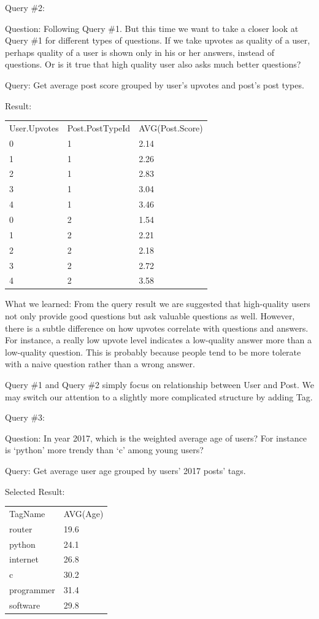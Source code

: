 Query \#2:

Question: 	Following  Query \#1. But this time we want to take a closer look at Query \#1 for different types of questions. If we take upvotes as quality of a user, perhaps quality of a user is shown only in his or her answers, instead of questions. Or is it true that high quality user also asks much better questions?

Query: 		Get average post score grouped by user’s upvotes and post’s post types. 

Result:

\begin {center}
\begin{tabular}{ l l l }
	User.Upvotes&Post.PostTypeId&AVG(Post.Score)\\0&1&2.14\\1&1&2.26\\2&1&2.83\\3&1&3.04\\4&1&3.46\\0&2&1.54\\1&2&2.21\\2&2&2.18\\3&2&2.72\\4&2&3.58\\
\end{tabular}
\end {center}



What we learned:	From the query result we are suggested that high-quality users not only provide good questions but ask valuable questions as well. However, there is a subtle difference on how upvotes correlate with questions and answers. For instance, a really low upvote level indicates a low-quality answer more than a low-quality question. This is probably because people tend to be more tolerate with a naive question rather than a wrong answer. 

Query \#1 and Query \#2 simply focus on relationship between User and Post. We may switch our attention to a slightly more complicated structure by adding Tag.

Query \#3:

Question: 	In year 2017, which is the weighted average age of users? For instance is ‘python’ more trendy than ‘c’ among young users? 

Query: 		Get average user age grouped by users’ 2017 posts’ tags. 

Selected Result:

\begin {center}
\begin{tabular}{ l l  }
	
	TagName&AVG(Age)\\router&19.6\\python&24.1\\internet&26.8\\c&30.2\\programmer&31.4\\software&29.8\\
	
\end{tabular}
\end {center}



